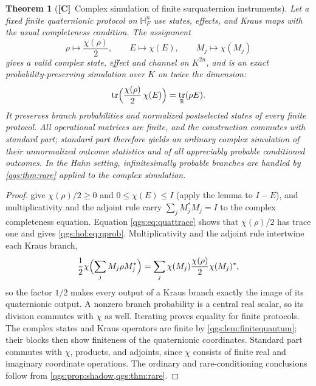 \documentclass[11pt,oneside]{article}
\numberwithin{equation}{section}
\theoremstyle{plain}
\newtheorem{theorem}{Theorem}[section]
\theoremstyle{definition}
\theoremstyle{remark}
\newcommand{\R}{\mathbb R}
\newcommand{\HF}{\mathbb H_F}
\DeclareMathOperator{\tr}{tr}
\newcommand{\TC}{\textcolor{TierC}{\textsf{\bfseries[C]}}}
\begin{document}
\begin{theorem}[\TC\ Complex simulation of finite surquaternion instruments]\label{qgs:thm:quatsimulation}
Let a fixed finite quaternionic protocol on $\HF^n$ use states, effects, and Kraus maps with the usual completeness condition. The assignment
\begin{equation}\label{qgs:eq:quatsim}
 \rho\longmapsto\frac{\chi(\rho)}2,
 \qquad E\longmapsto\chi(E),
 \qquad M_j\longmapsto\chi(M_j)
\end{equation}
gives a valid complex state, effect and channel on $K^{2n}$, and is an exact probability-preserving simulation over $K$ on twice the dimension:
\begin{equation}\label{qgs:hol:eq:qprob}
 \tr\Bigl(\frac{\chi(\rho)}2\,\chi(E)\Bigr)=\tr_\R(\rho E).
\end{equation}
It preserves branch probabilities and normalized postselected states of every finite protocol. All operational matrices are finite, and the construction commutes with standard part; standard part therefore yields an ordinary complex simulation of their unnormalized outcome statistics and of all appreciably probable conditioned outcomes. In the Hahn setting, infinitesimally probable branches are handled by \cref{qgs:thm:rare} applied to the complex simulation.
\end{theorem}
\begin{proof}
 give $\chi(\rho)/2\ge0$ and $0\le\chi(E)\le I$ (apply the lemma to $I-E$), and multiplicativity and the adjoint rule carry $\sum_jM_j^*M_j=I$ to the complex completeness equation. Equation \eqref{qgs:eq:quattrace} shows that $\chi(\rho)/2$ has trace one and gives \eqref{qgs:hol:eq:qprob}. Multiplicativity and the adjoint rule intertwine each Kraus branch,
\[
 \frac12\chi\Bigl(\sum_jM_j\rho M_j^*\Bigr)=\sum_j\chi(M_j)\frac{\chi(\rho)}2\chi(M_j)^*,
\]
so the factor $1/2$ makes every output of a Kraus branch exactly the image of its quaternionic output. A nonzero branch probability is a central real scalar, so its division commutes with $\chi$ as well. Iterating proves equality for finite protocols. The complex states and Kraus operators are finite by \cref{qgs:lem:finitequantum}; their blocks then show finiteness of the quaternionic coordinates. Standard part commutes with $\chi$, products, and adjoints, since $\chi$ consists of finite real and imaginary coordinate operations. The ordinary and rare-conditioning conclusions follow from \cref{qgs:prop:shadow,qgs:thm:rare}.
\end{proof}
\end{document}
